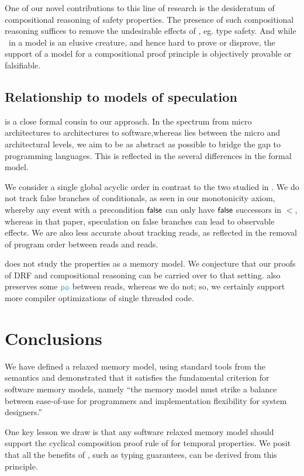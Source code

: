 One of our novel contributions to this line of research is the desideratum of
compositional reasoning of safety properties. The presence of such
compositional reasoning suffices to remove the undesirable effects of \oota,
eg. type safety.  And while \oota\ in a model is an elusive creature, and
hence hard to prove or disprove, the support of a model for a compositional
proof principle is objectively provable or falsifiable.

\subsection{Relationship to models of speculation}
\citet{2019-sp} is a close formal cousin to our approach.  In the spectrum
from micro architectures to architectures to software,whereas \citet{2019-sp}
lies between the micro and architectural levels, we aim to be as abstract as
possible to bridge the gap to programming languages.  This is reflected in
the several differences in the formal model.

We consider a single global acyclic order in contrast to the two studied in
\citet{2019-sp}.  We do not track false branches of conditionals, as seen in
our monotonicity axiom, whereby any event with a precondition $\mathsf{false}$ can
only have $\mathsf{false}$ successors in $\lt$, whereas in that paper, speculation on
false branches can lead to observable effects.  We are also less accurate
about tracking reads, as reflected in the removal of program order between
reads and reads.

\citet{2019-sp} does not study the properties as a memory model.  We
conjecture that our proofs of DRF and compositional reasoning can be carried
over to that setting. \citet{2019-sp} also preserves some $\rpox$ between
reads, whereas we do not; so, we certainly support more compiler
optimizations of single threaded code.


\section{Conclusions}
We have defined a relaxed memory model, using standard tools from the
semantics and demonstrated that it satisfies the fundamental criterion for
software memory models, namely ``the memory model must strike a balance
between ease-of-use for programmers and implementation flexibility for system
designers.''

One key lesson we draw is that any software relaxed memory model should
support the cyclical composition proof rule of
\citet{Abadi:1993:CS:151646.151649} for temporal properties.  We posit that all
the benefits of \oota, such as typing guarantees, can be derived from this
principle. 

